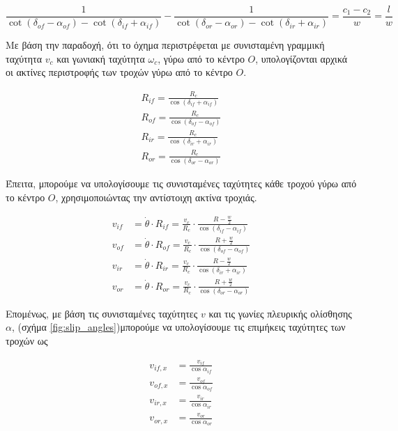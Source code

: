 \begin{equation}
	\frac{1}{\cot(\delta_{of} - \alpha_{of}) - \cot(\delta_{if} + \alpha_{if})} - \frac{1}{\cot(\delta_{or} - \alpha_{or}) - \cot(\delta_{ir} + \alpha_{ir})} = \frac{c_1 - c_2}{w} = \frac{l}{w}
	\label{eq:monst_kinematic_condition}
\end{equation}

\bigskip
Με βάση την παραδοχή, ότι το όχημα περιστρέφεται με συνισταμένη γραμμική ταχύτητα $v_c$ και γωνιακή ταχύτητα $\omega_c$, γύρω από το κέντρο $O$, υπολογίζονται αρχικά οι ακτίνες περιστροφής των τροχών γύρω από το κέντρο $O$.

\begin{align}
	R_{if} = \frac{R_c}{\cos(\delta_{if} + \alpha_{if})}
	\label{eq:monst_rif}\\
	R_{of} = \frac{R_c}{\cos(\delta_{of} - \alpha_{of})}
	\label{eq:monst_rof}\\
	R_{ir} = \frac{R_c}{\cos(\delta_{ir} + \alpha_{ir})}
	\label{eq:monst_rir}\\
	R_{or} = \frac{R_c}{\cos(\delta_{or} - \alpha_{or})}
	\label{eq:monst_ror}
\end{align}

\bigskip
Έπειτα, μπορούμε να υπολογίσουμε τις συνισταμένες ταχύτητες κάθε τροχού γύρω από το κέντρο $O$, χρησιμοποιώντας την αντίστοιχη ακτίνα τροχιάς.

\begin{align}
	\label{eq:monst_vif}	
	v_{if} &= \dot\theta \cdot R_{if} = \frac{v_c}{R_c} \cdot \frac{R - \frac{w}{2}}{\cos(\delta_{if} - \alpha_{if})}\\
	\label{eq:monst_vof}	
	v_{of} &= \dot\theta \cdot R_{of} = \frac{v_c}{R_c} \cdot \frac{R + \frac{w}{2}}{\cos(\delta_{of} - \alpha_{of})}\\
	\label{eq:monst_vir}	
	v_{ir} &= \dot\theta \cdot R_{ir} = \frac{v_c}{R_c} \cdot \frac{R - \frac{w}{2}}{\cos(\delta_{ir} + \alpha_{ir})} \\
	\label{eq:monst_vor}
	v_{or} &= \dot\theta \cdot R_{or} = \frac{v_c}{R_c} \cdot \frac{R + \frac{w}{2}}{\cos(\delta_{or} - \alpha_{or})}
\end{align}

Επομένως, με βάση τις συνισταμένες ταχύτητες $v$ και τις γωνίες πλευρικής ολίσθησης $\alpha$, (σχήμα \ref{fig:slip_angles})μπορούμε να υπολογίσουμε τις επιμήκεις ταχύτητες των τροχών ως

\begin{align}
	\label{eq:monst_vifx}	
	v_{if,x} &= \frac{v_{if}}{\cos\alpha_{if}}\\
	\label{eq:monst_vofx}	
	v_{of,x} &= \frac{v_{of}}{\cos\alpha_{of}} \\
	\label{eq:monst_virx}	
	v_{ir,x} &= \frac{v_{ir}}{\cos\alpha_{ir}} \\
	\label{eq:monst_vorx}
	v_{or,x} &= \frac{v_{or}}{\cos\alpha_{or}}
\end{align}

